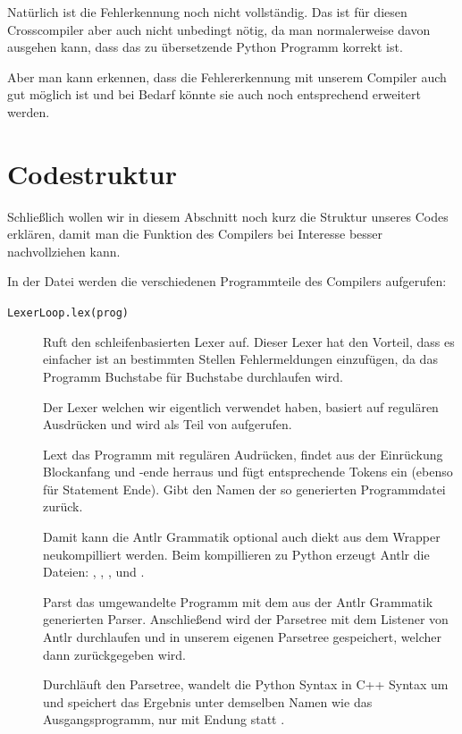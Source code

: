Natürlich ist die Fehlerkennung noch nicht vollständig. Das ist für diesen Crosscompiler aber auch nicht unbedingt nötig, da man normalerweise davon ausgehen kann, dass das zu übersetzende Python Programm korrekt ist.

Aber man kann erkennen, dass die Fehlererkennung mit unserem Compiler auch gut möglich ist und bei Bedarf könnte sie auch noch entsprechend erweitert werden.






\clearpage

\section{Codestruktur}

Schließlich wollen wir in diesem Abschnitt noch kurz die Struktur unseres Codes erklären, damit man die Funktion des Compilers bei Interesse besser nachvollziehen kann.

In der  Datei  werden die verschiedenen Programmteile des Compilers aufgerufen:

\begin{description}

\item[\texttt{LexerLoop.lex(prog)}] Ruft den schleifenbasierten Lexer auf. Dieser Lexer hat den Vorteil, dass es einfacher ist an bestimmten Stellen Fehlermeldungen einzufügen, da das Programm Buchstabe für Buchstabe durchlaufen wird.

 Der Lexer welchen wir eigentlich verwendet haben, basiert auf regulären Ausdrücken und wird als Teil von  aufgerufen.
 
\item[] Lext das Programm mit regulären Audrücken, findet aus der Einrückung Blockanfang und -ende herraus und fügt entsprechende Tokens ein (ebenso für Statement Ende). Gibt den Namen der so generierten Programmdatei zurück.

\item[] Damit kann die Antlr Grammatik  optional  auch diekt aus dem Wrapper neukompilliert werden. Beim kompillieren zu Python erzeugt Antlr die Dateien: , , ,  und  .

\item[] Parst das umgewandelte Programm  mit dem aus der Antlr Grammatik generierten Parser. Anschließend wird der Parsetree mit dem Listener von Antlr durchlaufen und in unserem eigenen Parsetree gespeichert, welcher dann zurückgegeben wird.


\item[] Durchläuft den Parsetree, wandelt die Python Syntax in C++ Syntax um und speichert das Ergebnis unter demselben Namen wie das Ausgangsprogramm, nur mit Endung  statt .

\end{description}

